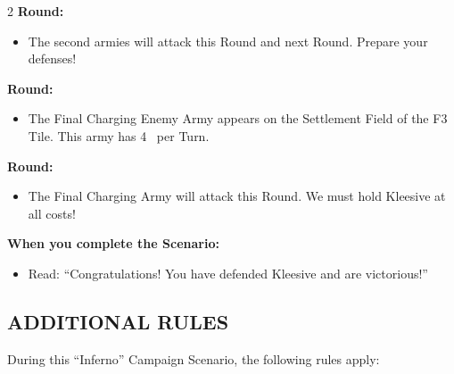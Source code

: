 \begin{multicols}{2}
\textbf{ Round:}
\begin{itemize}
  \item The second armies will attack this Round and next Round. Prepare your defenses!
\end{itemize}


\textbf{ Round:}
\begin{itemize}
  \item The Final Charging Enemy Army appears on the Settlement Field of the F3 Tile.
    This army has 4~ per Turn.
\end{itemize}

\textbf{ Round:}
\begin{itemize}
  \item The Final Charging Army will attack this Round.
    We must hold Kleesive at all costs!
\end{itemize}

\textbf{When you complete the Scenario:}
\begin{itemize}
  \item Read: ``Congratulations! You have defended Kleesive and are victorious!''
\end{itemize}

\subsection*{\MakeUppercase{Additional Rules}}

During this ``Inferno'' Campaign Scenario, the following rules apply:


\end{multicols}
